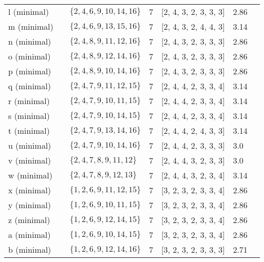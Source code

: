 \documentclass{article}%
\begin{document}
\begin{table}[ht]
\begin{tabularx}{\textwidth}{lXXXXXX}
			l (minimal) & {\Huge\textcolor{green11}{\textbullet}} & $\{2,4,6,9,10,14,16\}$ & 7 & [2, 4, 3, 2, 3, 3, 3] & 2.86 \\
			m (minimal) & {\Huge\textcolor{green12}{\textbullet}} & $\{2,4,6,9,13,15,16\}$ & 7 & [2, 4, 3, 2, 4, 4, 3] & 3.14 \\
			n (minimal) & {\Huge\textcolor{green13}{\textbullet}} & $\{2,4,8,9,11,12,16\}$ & 7 & [2, 4, 3, 2, 3, 3, 3] & 2.86 \\
			o (minimal) & {\Huge\textcolor{green14}{\textbullet}} & $\{2,4,8,9,12,14,16\}$ & 7 & [2, 4, 3, 2, 3, 3, 3] & 2.86 \\
			p (minimal) & {\Huge\textcolor{green15}{\textbullet}} & $\{2,4,8,9,10,14,16\}$ & 7 & [2, 4, 3, 2, 3, 3, 3] & 2.86 \\
			q (minimal) & {\Huge\textcolor{green16}{\textbullet}} & $\{2,4,7,9,11,12,15\}$ & 7 & [2, 4, 4, 2, 3, 3, 4] & 3.14 \\
			r (minimal) & {\Huge\textcolor{green17}{\textbullet}} & $\{2,4,7,9,10,11,15\}$ & 7 & [2, 4, 4, 2, 3, 3, 4] & 3.14 \\
			s (minimal) & {\Huge\textcolor{green18}{\textbullet}} & $\{2,4,7,9,10,14,15\}$ & 7 & [2, 4, 4, 2, 3, 3, 4] & 3.14 \\
			t (minimal) & {\Huge\textcolor{green19}{\textbullet}} & $\{2,4,7,9,13,14,16\}$ & 7 & [2, 4, 4, 2, 4, 3, 3] & 3.14 \\
			u (minimal) & {\Huge\textcolor{green20}{\textbullet}} & $\{2,4,7,9,10,14,16\}$ & 7 & [2, 4, 4, 2, 3, 3, 3] & 3.0 \\
			v (minimal) & {\Huge\textcolor{green21}{\textbullet}} & $\{2,4,7,8,9,11,12\}$ & 7 & [2, 4, 4, 3, 2, 3, 3] & 3.0 \\
			w (minimal) & {\Huge\textcolor{green22}{\textbullet}} & $\{2,4,7,8,9,12,13\}$ & 7 & [2, 4, 4, 3, 2, 3, 4] & 3.14 \\
			x (minimal) & {\Huge\textcolor{green23}{\textbullet}} & $\{1,2,6,9,11,12,15\}$ & 7 & [3, 2, 3, 2, 3, 3, 4] & 2.86 \\
			y (minimal) & {\Huge\textcolor{green24}{\textbullet}} & $\{1,2,6,9,10,11,15\}$ & 7 & [3, 2, 3, 2, 3, 3, 4] & 2.86 \\
			z (minimal) & {\Huge\textcolor{green25}{\textbullet}} & $\{1,2,6,9,12,14,15\}$ & 7 & [3, 2, 3, 2, 3, 3, 4] & 2.86 \\
			a (minimal) & {\Huge\textcolor{green26}{\textbullet}} & $\{1,2,6,9,10,14,15\}$ & 7 & [3, 2, 3, 2, 3, 3, 4] & 2.86 \\
			b (minimal) & {\Huge\textcolor{green27}{\textbullet}} & $\{1,2,6,9,12,14,16\}$ & 7 & [3, 2, 3, 2, 3, 3, 3] & 2.71 \\

\end{tabularx}
\end{table}
\end{document}
